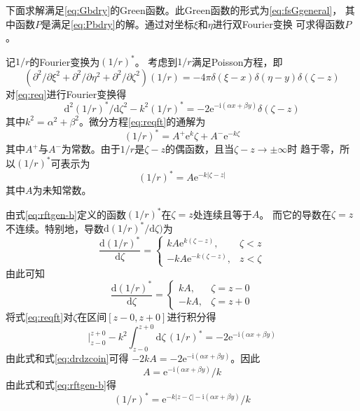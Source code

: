 下面求解满足\eqref{eq:Gbdry}的Green函数。此Green函数的形式为\eqref{eq:fsGgeneral}，
其中函数$P$是满足\eqref{eq:Pbdry}的解。通过对坐标$\xi$和$\eta$进行双Fourier变换
可求得函数$P$。

记$1/r$的Fourier变换为$(1/r)^*$。
考虑到$1/r$满足Poisson方程，即
\begin{equation}
  (\partial^2/\partial\xi^2+\partial^2/\partial\eta^2+\partial^2/\partial\zeta^2)
  (1/r)=-4\pi\delta(\xi-x)\delta(\eta-y)\delta(\zeta-z)
  \label{eq:req}
\end{equation}
对\eqref{eq:req}进行Fourier变换得
\begin{equation}
  \mathrm{d}^2(1/r)^*/\mathrm{d}\zeta^2-k^2(1/r)^*=-2\mathrm{e}^{-\mathrm{i}(\alpha x+\beta y)}\delta(\zeta-z)
  \label{eq:reqft}
\end{equation}
其中$k^2=\alpha^2+\beta^2$。微分方程\eqref{eq:reqft}的通解为
\begin{equation*}
  (1/r)^*=A^{+}\mathrm{e}^k\zeta+A^{-}\mathrm{e}^{-k\zeta}
\end{equation*}
其中$A^+$与$A^-$为常数。由于$1/r$是$\zeta-z$的偶函数，且当$\zeta-z\to\pm\infty$时
趋于零，所以$(1/r)^*$可表示为
\begin{equation}
  (1/r)^*=A\mathrm{e}^{-k|\zeta-z|}
  \label{eq:rftgen-b}
\end{equation}
其中$A$为未知常数。

由式\eqref{eq:rftgen-b}定义的函数$(1/r)^*$在$\zeta=z$处连续且等于$A$。
而它的导数在$\zeta=z$不连续。特别地，导数$\mathrm{d}(1/r)^*/\mathrm{d}\zeta)$为
\begin{equation*}
  \frac{\mathrm{d}(1/r)^*}{\mathrm{d}\zeta}=
  \left\{
    \begin{array}{ll}
      kA\mathrm{e}^{k(\zeta-z)}, & \zeta<z \\
      -kA\mathrm{e}^{-k(\zeta-z)}, & z<\zeta
    \end{array}
    \right.
\end{equation*}
由此可知
\begin{equation}
  \frac{\mathrm{d}(1/r)^*}{\mathrm{d}\zeta}=
  \left\{
    \begin{array}{ll}
      kA, & \zeta=z-0 \\
      -kA, & \zeta=z+0
    \end{array}
    \right.
  \label{eq:drdzcoin}
\end{equation}
将式\eqref{eq:reqft}对$\zeta$在区间$[z-0,z+0]$进行积分得
\begin{equation*}
  [\mathrm{d}(1/r)^*/\mathrm{d}\zeta]|^{z+0}_{z-0}-k^2\int_{z-0}^{z+0}
  \mathrm{d}\zeta\,(1/r)^*=-2\mathrm{e}^{-\mathrm{i}(\alpha x+\beta y)}
\end{equation*}
由此式和式\eqref{eq:drdzcoin}可得
$-2kA=-2\mathrm{e}^{-\mathrm{i}(\alpha x+\beta y)}$。因此
\begin{equation*}
  A=\mathrm{e}^{-\mathrm{i}(\alpha x+\beta y)}/k
\end{equation*}
由此式和式\eqref{eq:rftgen-b}得
\begin{equation}
(1/r)^*=\mathrm{e}^{-k|z-\zeta|-\mathrm{i}(\alpha x+\beta y)}/k
  \label{eq:rft}
\end{equation}

